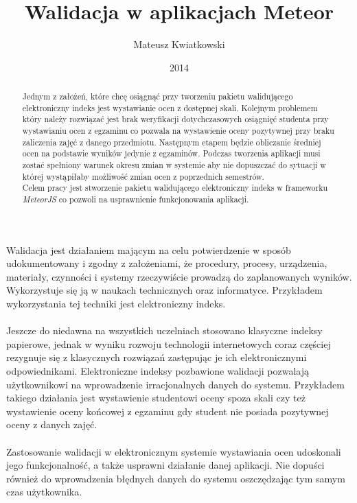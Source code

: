 \documentclass[brudnopis]{xmgr}
\author   {Mateusz Kwiatkowski}
\title    {Walidacja w aplikacjach Meteor}
\date     {2014}
\begin{document}
\begin{abstract}
Jednym z założeń, które chcę osiągnąć  przy tworzeniu pakietu walidującego elektroniczny indeks jest
wystawianie ocen z dostępnej skali.  Kolejnym problemem który należy rozwiązać jest brak weryfikacji
dotychczasowych osiągnięć studenta przy wystawianiu ocen z egzaminu co pozwala na wystawienie oceny
pozytywnej przy braku zaliczenia zajęć z danego przedmiotu. Następnym etapem będzie obliczanie średniej
ocen na podstawie wyników jedynie z egzaminów. Podczas tworzenia aplikacji musi zostać spełniony
warunek okresu zmian w systemie aby nie dopuszczać do sytuacji w której wystąpiłaby możliwość zmian
ocen z poprzednich semestrów.
\\
Celem pracy jest stworzenie pakietu walidującego elektroniczny indeks w frameworku \textit{MeteorJS} co pozwoli
na usprawnienie funkcjonowania aplikacji.

\end{abstract}

\maketitle
%
\introduction

Walidacja jest działaniem mającym na celu potwierdzenie w sposób udokumentowany i zgodny
z założeniami, że procedury, procesy, urządzenia, materiały, czynności i systemy rzeczywiście
prowadzą do zaplanowanych wyników. Wykorzystuje się ją w naukach technicznych oraz informatyce.
Przykładem wykorzystania tej techniki jest elektroniczny indeks.
\\
\\
Jeszcze do niedawna na wszystkich uczelniach stosowano klasyczne indeksy papierowe,
jednak w wyniku rozwoju technologii internetowych coraz częściej rezygnuje się z klasycznych
rozwiązań zastępując je ich elektronicznymi odpowiednikami. Elektroniczne indeksy pozbawione
walidacji pozwalają użytkownikowi na wprowadzenie irracjonalnych danych do systemu.
Przykładem takiego działania jest wystawienie studentowi oceny spoza skali czy też wystawienie
oceny końcowej z egzaminu gdy student nie posiada pozytywnej oceny z danych zajęć.
\\
\\
Zastosowanie walidacji w elektronicznym systemie wystawiania ocen udoskonali jego funkcjonalność,
a także usprawni działanie danej aplikacji. Nie dopuści również do wprowadzenia błędnych danych do systemu
oszczędzając tym samym czas użytkownika.
\end{document}
